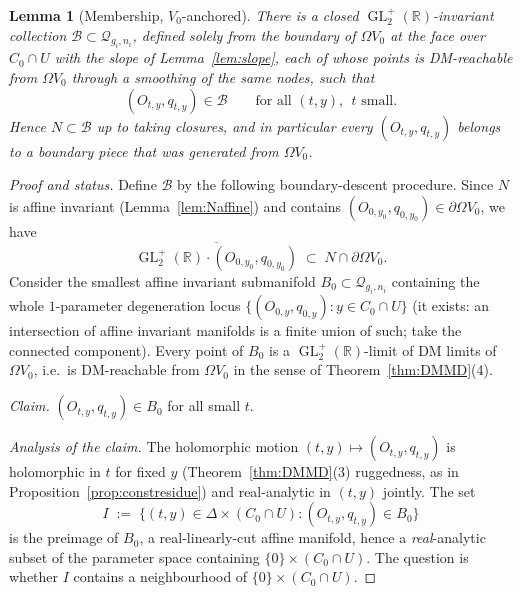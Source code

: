 \documentclass[11pt]{article}
\newcommand{\R}{\mathbb{R}}
\newcommand{\cQ}{\mathcal{Q}}
\DeclareMathOperator{\GL}{GL}
\newtheorem{lem}[thm]{Lemma}
\theoremstyle{definition}
\theoremstyle{remark}
\begin{document}
\begin{lem}[Membership, $V_0$-anchored]\label{lem:membership}
There is a closed $\GL_2^+(\R)$-invariant collection $\mathcal B
\subset \cQ_{g_i,n_i}$, defined solely from the boundary of
$\Omega V_0$ at the face over $C_0 \cap U$ with the slope of
Lemma~\ref{lem:slope}, each of whose points is DM-reachable from
$\Omega V_0$ through a smoothing of the same nodes, such that
\[
(O_{t,y}, q_{t,y}) \in \mathcal B \qquad \text{for all } (t,y),
\;\, t \text{ small}.
\]
Hence $N \subset \mathcal B$ up to taking closures, and in particular
every $(O_{t,y},q_{t,y})$ belongs to a boundary piece that was
generated from $\Omega V_0$.
\end{lem}

\begin{proof}[Proof and status]
Define $\mathcal B$ by the following boundary-descent procedure. Since
$N$ is affine invariant (Lemma~\ref{lem:Naffine}) and contains
$(O_{0,y_0}, q_{0,y_0}) \in \partial \Omega V_0$, we have
\[
\overline{\GL_2^+(\R) \cdot (O_{0,y_0}, q_{0,y_0})} \;\subset\;
N \cap \partial \Omega V_0 .
\]
Consider the smallest affine invariant submanifold $B_0 \subset
\cQ_{g_i,n_i}$ containing the whole $1$-parameter degeneration locus
$\{(O_{0,y},q_{0,y}) : y \in C_0 \cap U\}$ (it exists: an intersection
of affine invariant manifolds is a finite union of such; take the
connected component). Every point of $B_0$ is a
$\GL_2^+(\R)$-limit of DM limits of $\Omega V_0$, i.e.\ is
DM-reachable from $\Omega V_0$ in the sense of Theorem~\ref{thm:DMMD}(4).

\emph{Claim.} $(O_{t,y}, q_{t,y}) \in B_0$ for all small $t$.

\emph{Analysis of the claim.} The holomorphic motion $(t,y) \mapsto
(O_{t,y},q_{t,y})$ is holomorphic in $t$ for fixed $y$
(Theorem~\ref{thm:DMMD}(3) ruggedness, as in
Proposition~\ref{prop:constresidue}) and real-analytic in $(t,y)$
jointly. The set
\[
I \;:=\; \{(t,y) \in \Delta \times (C_0\cap U) : (O_{t,y},q_{t,y}) \in
B_0\}
\]
is the preimage of $B_0$, a real-linearly-cut affine manifold, hence a
\emph{real}-analytic subset of the parameter space containing
$\{0\} \times (C_0 \cap U)$. The question is whether $I$ contains a
neighbourhood of $\{0\}\times(C_0\cap U)$.


\end{proof}
\end{document}
